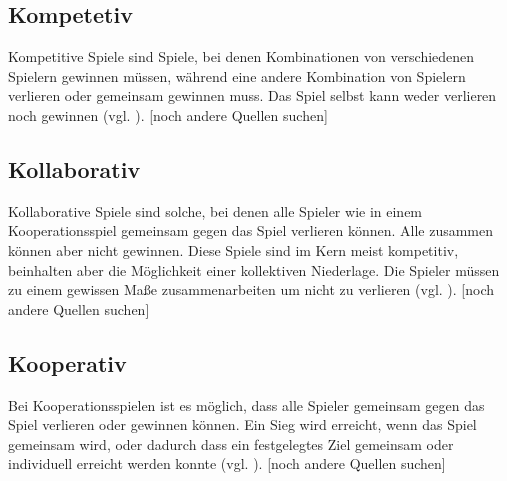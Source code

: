 \subsection{Kompetetiv}
Kompetitive Spiele sind Spiele, bei denen Kombinationen von verschiedenen Spielern gewinnen müssen, während eine andere Kombination von Spielern verlieren oder gemeinsam gewinnen muss. Das Spiel selbst kann weder verlieren noch gewinnen (vgl. \cite{noauthor_game_2014}). [noch andere Quellen suchen]

\subsection{Kollaborativ}
Kollaborative Spiele sind solche, bei denen alle Spieler wie in einem Kooperationsspiel gemeinsam gegen das Spiel verlieren können. Alle zusammen können aber nicht gewinnen. Diese Spiele sind im Kern meist kompetitiv, beinhalten aber die Möglichkeit einer kollektiven Niederlage. Die Spieler müssen zu einem gewissen Maße zusammenarbeiten um nicht zu verlieren (vgl. \cite{noauthor_game_2014}). [noch andere Quellen suchen]

\subsection{Kooperativ}
Bei Kooperationsspielen ist es möglich, dass alle Spieler gemeinsam gegen das Spiel verlieren oder gewinnen können. Ein Sieg wird erreicht, wenn das Spiel gemeinsam  wird, oder dadurch dass ein festgelegtes Ziel gemeinsam oder individuell erreicht werden konnte (vgl. \cite{noauthor_game_2014}). [noch andere Quellen suchen]



